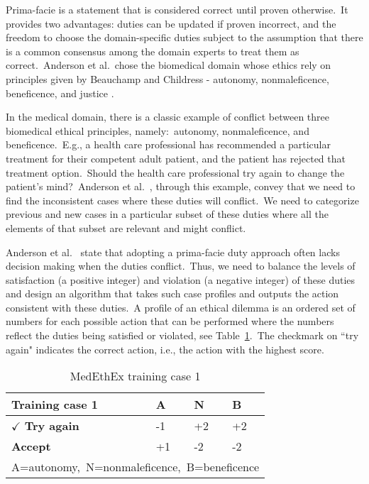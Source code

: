  Prima-facie is a statement that is considered correct until proven otherwise.\ It provides two advantages: duties can be updated if proven incorrect, and the freedom to choose the domain-specific duties subject to the assumption that there is a common consensus among the domain experts to treat them as correct.\ Anderson et al.\ chose the biomedical domain whose ethics rely on principles given by Beauchamp and Childress - autonomy, nonmaleficence, beneficence, and justice \cite{beauchamp2001principles}.

 In the medical domain, there is a classic example of conflict between three biomedical ethical principles, namely:\ autonomy, nonmaleficence, and beneficence.\ E.g., a health care professional has recommended a particular treatment for their competent adult patient, and the patient has rejected that treatment option.\ Should the health care professional try again to change the patient’s mind?\ Anderson et al.\ \cite{Anderson_Anderson_2007}, through this example, convey that we need to find the inconsistent cases where these duties will conflict.\ We need to categorize previous and new cases in a particular subset of these duties where all the elements of that subset are relevant and might conflict.

 Anderson et al.\ \cite{Anderson_Anderson_2007} state that adopting a prima-facie duty approach often lacks decision making when the duties conflict.\ Thus, we need to balance the levels of satisfaction (a positive integer) and violation (a negative integer) of these duties and design an algorithm that takes such case profiles and outputs the action consistent with these duties.\ A profile of an ethical dilemma is an ordered set of numbers for each possible action that can be performed where the numbers reflect the duties being satisfied or violated, see Table~\ref{profile}.\ The checkmark on ``try again" indicates the correct action, i.e., the action with the highest score.\ 

\begin{table}[h]
    \caption{MedEthEx training case 1}
    \label{profile}
    \scriptsize
    \centering
    \begin{tabular}{|p{2.5cm}|p{0.75cm}|p{0.75cm}|p{0.75cm}|}
        \hline
         \textbf{Training case} 1 & \textbf{A} & \textbf{N} & \textbf{B}\\
         \hline
         $\checkmark$ \textbf{Try again} & -1 & +2 & +2 \\
         \hline
         \textbf{Accept} & +1 & -2 &-2 \\
         \hline
         \multicolumn{4}{|p{7cm}|}{A=autonomy,\ N=nonmaleficence,\ B=beneficence}\\
         \hline
    \end{tabular}
\end{table}

